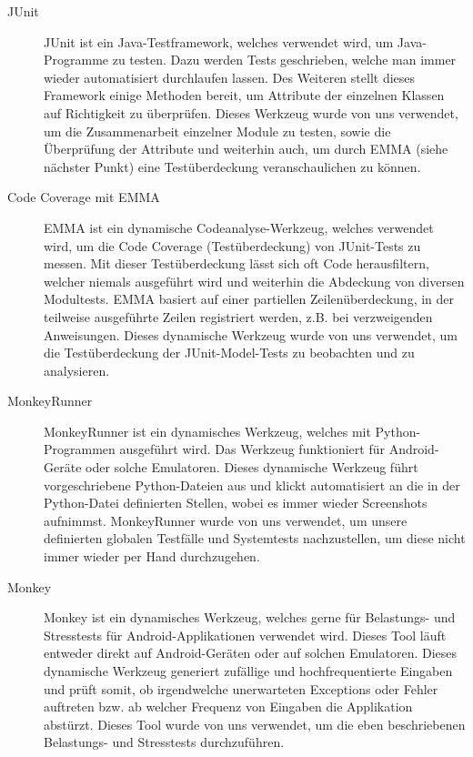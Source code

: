 \begin{description} 
\item[JUnit] JUnit ist ein Java-Testframework, welches verwendet wird, um Java-Programme zu testen. Dazu werden Tests geschrieben, welche man immer wieder automatisiert durchlaufen lassen.
	Des Weiteren stellt dieses Framework einige Methoden bereit, um Attribute der einzelnen Klassen auf Richtigkeit zu überprüfen.
	Dieses Werkzeug wurde von uns verwendet, um die Zusammenarbeit einzelner Module zu testen, sowie die Überprüfung der Attribute und weiterhin auch, um durch EMMA (siehe nächster Punkt) 
	eine Testüberdeckung veranschaulichen zu können.


\item[Code Coverage mit EMMA] EMMA ist ein dynamische Codeanalyse-Werkzeug, welches verwendet wird, um die Code Coverage (Testüberdeckung) von JUnit-Tests zu messen.
	Mit dieser Testüberdeckung lässt sich oft  Code herausfiltern, welcher niemals ausgeführt wird und weiterhin die Abdeckung von diversen Modultests.
	EMMA basiert auf einer partiellen Zeilenüberdeckung, in der teilweise ausgeführte Zeilen registriert werden, z.B. bei verzweigenden Anweisungen.
	Dieses dynamische Werkzeug wurde von uns verwendet, um die Testüberdeckung der JUnit-Model-Tests zu beobachten und zu analysieren. 

\item[MonkeyRunner] MonkeyRunner ist ein dynamisches Werkzeug, welches mit Python-Programmen ausgeführt wird. Das Werkzeug funktioniert für Android-Geräte oder solche Emulatoren.
	Dieses dynamische Werkzeug führt vorgeschriebene Python-Dateien aus und klickt automatisiert an die in der Python-Datei definierten Stellen, wobei es immer wieder Screenshots aufnimmst.
	MonkeyRunner wurde von uns verwendet, um unsere definierten globalen Testfälle und Systemtests nachzustellen, um diese nicht immer wieder per Hand durchzugehen.


\item[Monkey] Monkey ist ein dynamisches Werkzeug, welches gerne für Belastungs- und Stresstests für Android-Applikationen verwendet wird. Dieses Tool läuft entweder direkt auf Android-Geräten oder auf solchen Emulatoren.
	Dieses dynamische Werkzeug generiert zufällige und hochfrequentierte Eingaben und prüft somit, ob irgendwelche unerwarteten Exceptions oder Fehler auftreten bzw. ab welcher Frequenz von Eingaben die Applikation 	  abstürzt. Dieses Tool wurde von uns verwendet, um die eben beschriebenen Belastungs- und Stresstests durchzuführen.
\end{description}